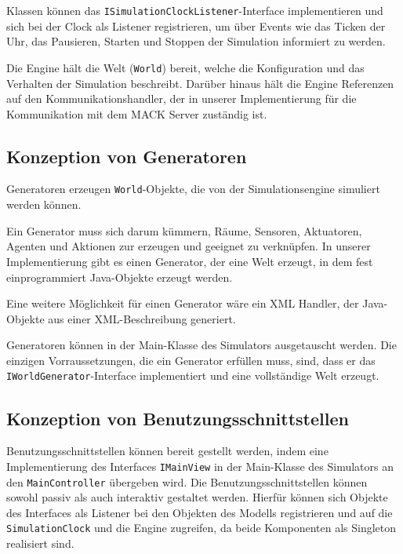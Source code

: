 Klassen können das \texttt{ISimulationClockListener}-Interface implementieren und sich bei der Clock als Listener registrieren, um über Events wie das Ticken der Uhr, das Pausieren, Starten und Stoppen der Simulation informiert zu werden.

Die Engine hält die Welt (\texttt{World}) bereit, welche die Konfiguration und das Verhalten der Simulation beschreibt. Darüber hinaus hält die Engine Referenzen auf den Kommunikationshandler, der in unserer Implementierung für die Kommunikation mit dem MACK Server zuständig ist.

\subsection{Konzeption von Generatoren}\label{subsec:concept_generators}
Generatoren erzeugen \texttt{World}-Objekte, die von der Simulationsengine simuliert werden können.

Ein Generator muss sich darum kümmern, Räume, Sensoren, Aktuatoren, Agenten und Aktionen zur erzeugen und geeignet zu verknüpfen. In unserer Implementierung gibt es einen Generator, der eine Welt erzeugt, in dem fest einprogrammiert Java-Objekte erzeugt werden.

Eine weitere Möglichkeit für einen Generator wäre ein XML Handler, der Java-Objekte aus einer XML-Beschreibung generiert.

Generatoren können in der Main-Klasse des Simulators ausgetauscht werden. Die einzigen Vorraussetzungen, die ein Generator erfüllen muss, sind, dass er das \texttt{IWorldGenerator}-Interface implementiert und eine vollständige Welt erzeugt.


\subsection{Konzeption von Benutzungsschnittstellen}\label{subsec:concept_interfaces}
Benutzungsschnittstellen können bereit gestellt werden, indem eine Implementierung des Interfaces \texttt{IMainView} in der Main-Klasse des Simulators an den \texttt{MainController} übergeben wird. Die Benutzungsschnittstellen können sowohl passiv als auch interaktiv gestaltet werden. Hierfür können sich Objekte des Interfaces als Listener bei den Objekten des Modells registrieren und auf die \texttt{SimulationClock} und die Engine zugreifen, da beide Komponenten als Singleton realisiert sind.

